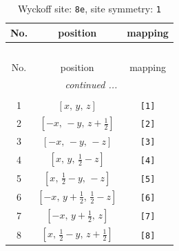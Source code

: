 \documentclass[fleqn,8pt]{jsarticle}
\begin{document}
\renewcommand{\arraystretch}{1.2}
\begin{longtable}{ccc}
\caption{Wyckoff site: {\tt 8e}, site symmetry: {\tt 1}}
 \\
 \hline \hline
No. & position & mapping \\ \hline \endfirsthead

\multicolumn{2}{l}{\tablename\ \thetable{}} \\
 \hline \hline
No. & position & mapping \\ \hline \endhead

 \hline \hline
\multicolumn{2}{r}{\footnotesize\it continued ...} \\ \endfoot

 \hline \hline
\multicolumn{2}{r}{} \\ \endlastfoot

1 & $\left[ x,\, y,\, z \right]$ & {\tt [1]} \\ \hline
2 & $\left[ - x,\, - y,\, z + \frac{1}{2} \right]$ & {\tt [2]} \\ \hline
3 & $\left[ - x,\, - y,\, - z \right]$ & {\tt [3]} \\ \hline
4 & $\left[ x,\, y,\, \frac{1}{2} - z \right]$ & {\tt [4]} \\ \hline
5 & $\left[ x,\, \frac{1}{2} - y,\, - z \right]$ & {\tt [5]} \\ \hline
6 & $\left[ - x,\, y + \frac{1}{2},\, \frac{1}{2} - z \right]$ & {\tt [6]} \\ \hline
7 & $\left[ - x,\, y + \frac{1}{2},\, z \right]$ & {\tt [7]} \\ \hline
8 & $\left[ x,\, \frac{1}{2} - y,\, z + \frac{1}{2} \right]$ & {\tt [8]} \\
\end{longtable}
\end{document}
